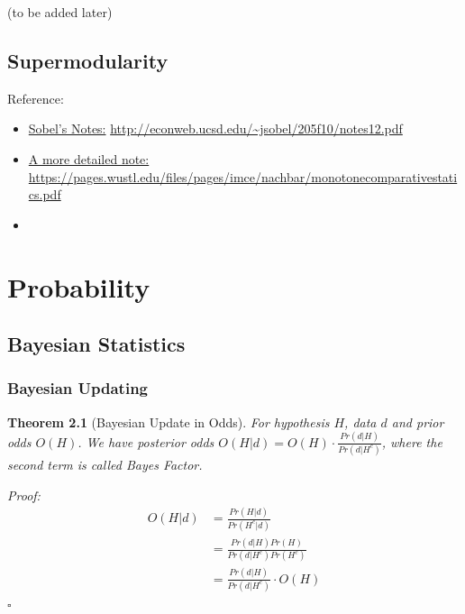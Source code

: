 \documentclass{book}
\theoremstyle{plain}
\newtheorem{thm}{Theorem}[section] %
\theoremstyle{definition}
\newenvironment{myproof}
{\noindent\textit{Proof:}}{\hfill$\square$}
\begin{document}
(to be added later)



\section{Supermodularity} %
\label{sec:supermodularity}

\noindent
Reference: 
\begin{itemize}
	\item \href{run:resources/sobel_supermodularity.pdf}{Sobel's Notes:} \url{http://econweb.ucsd.edu/~jsobel/205f10/notes12.pdf}
	\item \href{run:resources/monotone_comparative_statics.pdf}{A more detailed note:} \url{https://pages.wustl.edu/files/pages/imce/nachbar/monotonecomparativestatics.pdf}
	\item {}
\end{itemize}










\chapter{Probability} %
\label{cha:probability}



\section{Bayesian Statistics} %
\label{sec:bayesian_statistics}

\subsection{Bayesian Updating} %
\label{sub:bayesian_updating}

\begin{thm}[Bayesian Update in Odds]
For hypothesis $H$, data $d$ and prior odds $O(H)$. We have posterior odds 
$O(H|d) = O(H)\cdot\frac{Pr(d|H)}{Pr(d|H^c)}$,
where the second term is called \textit{Bayes Factor}.
\end{thm}

\begin{myproof}
\begin{align*}
	O(H|d)&=\frac{Pr(H|d)}{Pr(H^c|d)} \\
	&=\frac{Pr(d|H)Pr(H)}{Pr(d|H^c)Pr(H^c)}\\
	&=\frac{Pr(d|H)}{Pr(d|H^c)}\cdot O(H)
\end{align*}
\end{myproof}
\end{document}
